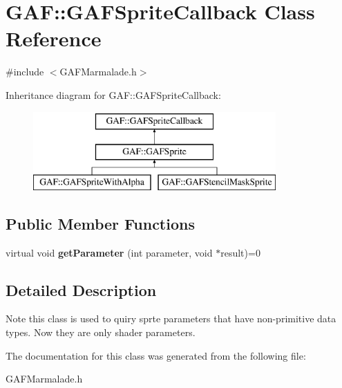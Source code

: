 \hypertarget{class_g_a_f_1_1_g_a_f_sprite_callback}{\section{G\-A\-F\-:\-:G\-A\-F\-Sprite\-Callback Class Reference}
\label{class_g_a_f_1_1_g_a_f_sprite_callback}
}


{\ttfamily \#include $<$G\-A\-F\-Marmalade.\-h$>$}

Inheritance diagram for G\-A\-F\-:\-:G\-A\-F\-Sprite\-Callback\-:\begin{figure}[H]
\begin{center}
\leavevmode
\includegraphics[height=3.000000cm]{class_g_a_f_1_1_g_a_f_sprite_callback}
\end{center}
\end{figure}
\subsection*{Public Member Functions}
\begin{DoxyCompactItemize}
\item 
\hypertarget{class_g_a_f_1_1_g_a_f_sprite_callback_a153d7fa63a377b294fa9b040f89bd6a6}{virtual void {\bfseries get\-Parameter} (int parameter, void $\ast$result)=0}\label{class_g_a_f_1_1_g_a_f_sprite_callback_a153d7fa63a377b294fa9b040f89bd6a6}

\end{DoxyCompactItemize}


\subsection{Detailed Description}
\begin{DoxyNote}{Note}
this class is used to quiry sprte parameters that have non-\/primitive data types. Now they are only shader parameters. 
\end{DoxyNote}


The documentation for this class was generated from the following file\-:\begin{DoxyCompactItemize}
\item 
G\-A\-F\-Marmalade.\-h\end{DoxyCompactItemize}
